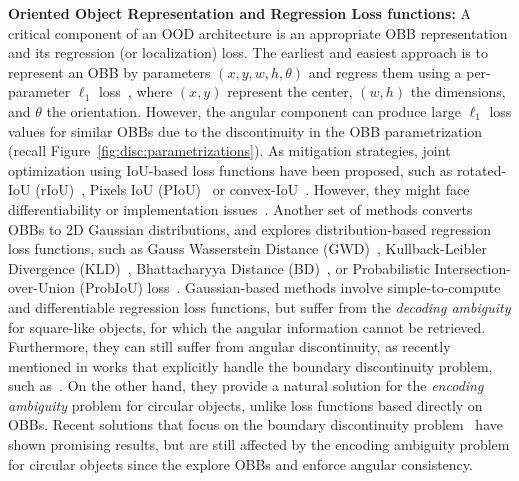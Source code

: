 \noindent
\textbf{Oriented Object Representation and Regression Loss functions:}
A critical component of an OOD architecture is an appropriate OBB representation and its regression (or localization) loss. The earliest and easiest approach is to represent an OBB by parameters $(x,y,w,h, \theta)$ and regress them using a per-parameter $\ell_1$ loss~\cite{yang2019l1ood}, where $(x,y)$ represent the center, $(w,h)$ the dimensions, and $\theta$ the orientation. However, the angular component can produce large $\ell_1$ loss values for similar OBBs due to the discontinuity in the OBB parametrization (recall Figure~\ref{fig:disc:parametrizations}). As mitigation strategies, joint optimization using  IoU-based loss functions have been proposed, such as rotated-IoU (rIoU)~\cite{zhou2019iou}, Pixels IoU (PIoU)~\cite{Chen:EECV:2020} or convex-IoU~\cite{guo2021beyond}. However, they might face differentiability or implementation issues~\cite{yang2021rethinking}. Another set of methods converts OBBs to 2D Gaussian distributions, and explores distribution-based regression loss functions, such as Gauss Wasserstein Distance (GWD)~\cite{yang2021rethinking}, Kullback-Leibler Divergence (KLD)~\cite{yang2021learning}, Bhattacharyya Distance (BD)~\cite{yang2023detecting}, or Probabilistic Intersection-over-Union (ProbIoU) loss~\cite{murrugarra2024probabilistic}. Gaussian-based methods involve simple-to-compute and differentiable regression loss functions, but suffer from the \textit{decoding ambiguity} for square-like objects, for which the angular information cannot be retrieved. Furthermore, they can still suffer from angular discontinuity, as recently mentioned in works that explicitly handle the boundary discontinuity problem, such as~\cite{yu2024boundary,xu2024rethinking}. On the other hand, they provide a natural solution for the \textit{encoding ambiguity} problem for circular objects, unlike loss functions based directly on OBBs. Recent solutions that focus on the boundary discontinuity problem~\cite{yang2020arbitrary,yang2021dense,yang2022scrdet++,yu2023phase,yu2024boundary,xu2024rethinking,xiao2024theoretically} have shown promising results, but are still affected by the encoding ambiguity problem for circular objects since the explore OBBs and enforce angular consistency.

